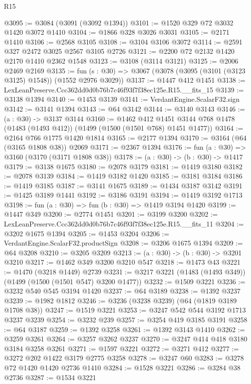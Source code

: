 \begin{lexlean}{R15}
\begin{coremodule}
@3095 := @3084 (@3091 (@3092 @1394))
@3101 := @1520 @329 @72 @3032 @1420 @3072 @1410
@3104 := @1866 @328 @3026 @3031
@3105 := @2171 @1410
@3106 := @2568 @3105
@3108 := @3104 @3106 @3072
@3114 := @2591 @327 @2472 @3025 @2567 @3105 @2726
@3121 := @2200 @72 @2132 @1420 @2170 @1410 @2362 @1548
@3123 := @3108 (@3114 @3121)
@3125 := @2006 @2469 @2169
@3135 := fun (s : @30) => @3067 (@3078 (@3095 (@3101 (@3123 @3125) @1548)) (@1552 @2976 @3029))
@3137 := @1447 @412 @1451
@3138 := LexLeanPreserve.Ccc362dd0d0b76b7c46f93f7f38ec125e.R15.__fits_15
@3139 := @3138 @1394
@3140 := @1453 @3139
@3141 := VerdantEngine.ScalarF32.sign
@3142 := @3141 @1394
@3143 := @64 @3142
@3144 := @3140 @3143
@3146 := (a : @30) -> @3137 @3144
@3160 := @1462
    @412
    @1451
    @3144
    @768
    @1478
    (@1483 (@1493 @412))
    (@1499 (@1500 (@1501 @768) @1451 @1477))
@3164 := @2164 @766 @1775 @1420 @1814
@3165 := @2177 @1394
@3170 := @3164 (@64 (@3165 @1808 @38)) @2069
@3171 := @2367 @1394
@3176 := fun (a : @30) => @3160 (@3170 (@3171 @1808 @38))
@3178 := (a : @30) -> (b : @30) -> @1417
@3179 := @3138 @1675
@3180 := @2078 @3179
@3181 := @1419 @3180
@3182 := @2078 @3139
@3184 := @1419 @3182 @1420
@3185 := @3181 @3184
@3186 := @1419 @3185
@3187 := @3141 @1675
@3189 := @1434 @3187 @3142
@3191 := @1425 @3189 @1441
@3192 := @3186 @3191
@3194 := @1419 @3192 @1713
@3198 := fun (a : @30) => fun (b : @30) => @1419 @3194 @1420
@3199 := @1447 @349
@3200 := @2774 @1451
@3201 := @3199 @3200
@3202 := LexLeanPreserve.Ccc362dd0d0b76b7c46f93f7f38ec125e.R15.__fits_11
@3204 := @3202 @1675 @1394
@3205 := @1453 @3204
@3206 := VerdantEngine.ScalarF32.productSign
@3208 := @3206 @1675 @1394
@3209 := @64 @3208
@3210 := @3205 @3209
@3213 := (a : @30) -> (b : @30) -> @3201 @3210
@3217 := @1462 @349 @3200 @3210 @547
@3218 := @1473 @43
@3221 := @1470 (@3218 @1449) @2739
@3231 := @3217 @3221 (@1483 (@1493 @349)) (@1499 (@1500 (@1501 @547) @3200 @1477))
@3232 := @1509 @3221
@3236 := @3232 @540 @545 @3194 @1420
@3237 := @64 @3189
@3238 := @1392 @3237
@3239 := @1982 @1812
@3246 := @3236 (@3238 @3239) (@64 (@1819 @3189 @1708 @38))
@3247 := @1519 @3221
@3253 := @3247 @542 @544 @3192 @1713 @3237 @3239
@3254 := @3232 @239
@3257 := @3254 @419 @3185 @3191
@3258 := @64 @3187
@3259 := @1392 @3258
@3261 := @1392 @3143 @1410
@3262 := @3259 @3261
@3264 := @3257 @3262 @3237
@3270 := @3247 @414 @418 @3180 @3184 @3258 @3261
@3271 := @1597 @3221
@3272 := @3271 @412
@3277 := @3272 @202 @1422 @3179 @2775 @3258
@3278 := @3247 @60
@3283 := @3278 @72 @1420 @1420 @2736 @1410
@3284 := @1528 @3221
@3286 := @3284 @38 @2736
@3287 := @1534 @3221

\end{coremodule}
\end{lexlean}
